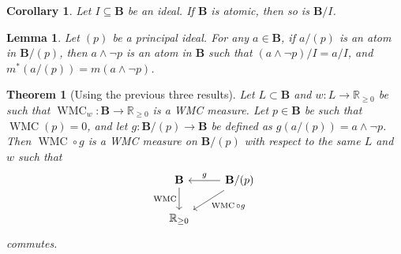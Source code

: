 \documentclass{article}
\newtheorem{theorem}{Theorem}
\newtheorem{lemma}{Lemma}
\newtheorem{corollary}{Corollary}
\theoremstyle{definition}
\theoremstyle{remark}
\DeclareMathOperator{\WMC}{WMC}
\begin{document}
\begin{corollary}
  Let $I \subseteq \mathbf{B}$ be an ideal. If $\mathbf{B}$ is atomic, then so
  is $\mathbf{B}/I$.
\end{corollary}

\begin{lemma}
  Let $(p)$ be a principal ideal. For any $a \in \mathbf{B}$, if $a/(p)$ is an
  atom in $\mathbf{B}/(p)$, then $a \land \neg p$ is an atom in $\mathbf{B}$
  such that $(a \land \neg p)/I = a/I$, and $m^*(a/(p)) = m(a \land \neg p)$.
\end{lemma}

\begin{theorem}[Using the previous three results]
  Let $L \subset \mathbf{B}$ and $w\colon L \to \mathbb{R}_{\ge 0}$ be such that
  $\WMC_w\colon \mathbf{B} \to \mathbb{R}_{\ge0}$ is a WMC measure. Let $p \in
  \mathbf{B}$ be such that $\WMC(p) = 0$, and let $g\colon \mathbf{B}/(p) \to
  \mathbf{B}$ be defined as $g(a/(p)) = a \land \neg p$. Then $\WMC \circ g$
  is a WMC measure on $\mathbf{B}/(p)$ with respect to the same $L$ and $w$
  such that
  \[
    \begin{tikzcd}
      \mathbf{B} \arrow{d}[swap]{\WMC} & \mathbf{B}/(p) \arrow{l}[swap]{g}
      \arrow{dl}{\WMC \circ g} \\
      \mathbb{R}_{\ge 0}
    \end{tikzcd}
  \]
  commutes.
\end{theorem}


\end{document}
